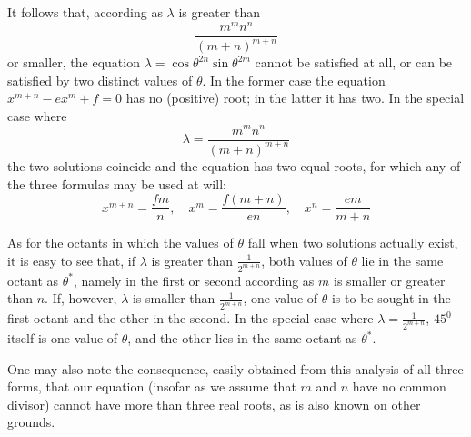 It follows that, according as $\lambda$ is greater than
\[
\frac{m^m n^n}{(m+n)^{m+n}}
\]
or smaller, the equation $\lambda=\cos\theta^{2n}\sin\theta^{2m}$ cannot be satisfied at all, or can be satisfied by two distinct values of $\theta$. In the former case the equation $x^{m+n}-ex^m+f=0$ has no (positive) root; in the latter it has two. In the special case where
\[
\lambda=\frac{m^m n^n}{(m+n)^{m+n}}
\]
the two solutions coincide and the equation has two equal roots, for which any of the three formulas may be used at will:
\[
x^{m+n}=\frac{fm}{n},\quad
x^m=\frac{f(m+n)}{en},\quad
x^n=\frac{em}{m+n}
\]

As for the octants in which the values of $\theta$ fall when two solutions actually exist, it is easy to see that, if $\lambda$ is greater than $\frac{1}{2^{m+n}}$, both values of $\theta$ lie in the same octant as $\theta^*$, namely in the first or second according as $m$ is smaller or greater than $n$. If, however, $\lambda$ is smaller than $\frac{1}{2^{m+n}}$, one value of $\theta$ is to be sought in the first octant and the other in the second. In the special case where $\lambda=\frac{1}{2^{m+n}}$, $45^0$ itself is one value of $\theta$, and the other lies in the same octant as $\theta^*$.

One may also note the consequence, easily obtained from this analysis of all three forms, that our equation (insofar as we assume that $m$ and $n$ have no common divisor) cannot have more than three real roots, as is also known on other grounds.

